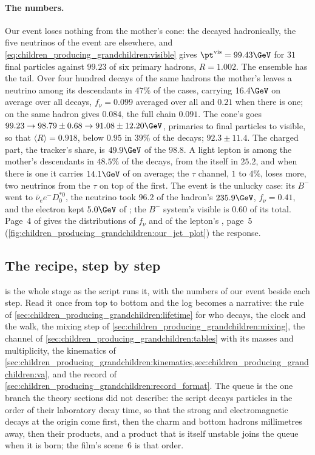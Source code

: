 \paragraph{The numbers.} Our event loses nothing from the mother's cone:
the \Bbar decayed hadronically, the five neutrinos of the event are
elsewhere, and \cref{eq:children_producing_grandchildren:visible} gives
$\pt^{\mathrm{vis}}=99.43\GeV$ for $31$ final particles against $99.23$
of six primary hadrons, $R=1.002$. The ensemble has the tail. Over four
hundred decays of the same hadrons the mother's \Bbar leaves a neutrino
among its descendants in $47\%$ of the cases, carrying $16.4\GeV$ on
average over all decays, $f_\nu=0.099$ averaged over all and $0.21$ when
there is one; \PYTHIA on the same hadron gives $0.084$, the full chain
$0.091$. The cone's \pt goes $99.23\to98.79\pm0.68\to91.08\pm12.20\GeV$,
primaries to final particles to visible, so that $\langle R\rangle=0.918$,
below $0.95$ in $39\%$ of the decays; \PYTHIA $92.3\pm11.4$. The charged
part, the tracker's share, is $49.9\GeV$ of the $98.8$. A light lepton is
among the mother's descendants in $48.5\%$ of the decays, from the \Bbar
itself in $25.2$, and when there is one it carries $14.1\GeV$ of \pt on
average; the $\tau$ channel, $1$ to $4\%$, loses more, two neutrinos from
the $\tau$ on top of the first. The \CMSSW event is the unlucky case:
its $B^-$ went to $\bar\nu_e e^-D_0^{*0}$, the neutrino took $96.2$ of the
hadron's $235.9\GeV$, $f_\nu=0.41$, and the electron kept $5.0\GeV$ of
\pt; the $B^-$ system's visible \pt is $0.60$ of its total. Page~4 of
 gives the distributions of $f_\nu$ and of
the lepton's \pt, page~5 (\cref{fig:children_producing_grandchildren:our_jet_plot})
the response.

\subsection{The recipe, step by step}
\label{sec:children_producing_grandchildren:step_by_step}

 is the whole stage as the
script runs it, with the numbers of our event beside each step. Read it
once from top to bottom and the  log becomes a narrative: the
rule of \cref{sec:children_producing_grandchildren:lifetime} for who
decays, the clock and the walk, the mixing step of
\cref{sec:children_producing_grandchildren:mixing}, the channel of
\cref{sec:children_producing_grandchildren:tables} with its masses and
multiplicity, the kinematics of
\cref{sec:children_producing_grandchildren:kinematics,sec:children_producing_grandchildren:va},
and the record of \cref{sec:children_producing_grandchildren:record_format}.
The queue is the one branch the theory sections did not describe: the
script decays particles in the order of their laboratory decay time, so
that the strong and electromagnetic decays at the origin come first, then
the charm and bottom hadrons millimetres away, then their products, and a
product that is itself unstable joins the queue when it is born; the film's
scene~6 is that order.

